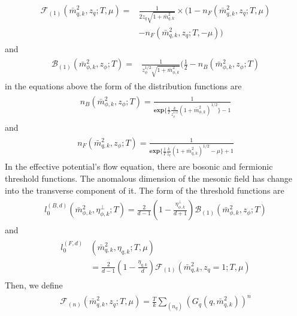 \documentclass[%
reprint,
superscriptaddress,
showpacs,preprintnumbers,
 amsmath,amssymb,
 aps,
prd,
]{revtex4-1}
\begin{document}
\begin{align}
\begin{split}
\mathcal{F}_{(1)}(\bar{m}^{2}_{q,k},z_q;T,\mu)=&\frac{1}{2z_q\sqrt{1+\bar{m}^{2}_{q,k}}}\times(1-n_F(\bar{m}^{2}_{q,k},z_q
;T,\mu)\\&-n_F(\bar{m}^{2}_{q,k},z_q;T,-\mu))
\end{split}
\end{align} 
and
\begin{align}
\begin{split}
\mathcal{B}_{(1)}(\bar{m}^{2}_{\phi,k},z_\phi;T)=&\frac{1}{z_\phi^{1/2}\sqrt{1+\bar{m}^{2}_{\phi,k}}}
(\frac{1}{2}-n_B(\bar{m}^{2}_{\phi,k},z_\phi;T)
\end{split}
\end{align} 
in the equations above the form of the distribution functions are
\begin{align}
\begin{split}
n_B(\bar{m}^{2}_{\phi,k},z_\phi;T)=\frac{1}{\mathbf{exp}\lbrace \frac{1}{T}\frac{k}{z_\phi^{1/2}}(1+\bar{m}^{2}_{\phi,k})^{1/2} 
\rbrace-1}
\end{split}
\end{align} 
and
\begin{align}
\begin{split}
n_F(\bar{m}^{2}_{q,k},z_\phi;T)=\frac{1}{\mathbf{exp}\lbrace \frac{1}{T}\frac{k}{z_q}(1+\bar{m}^{2}_{q,k})^{1/2}-\mu 
\rbrace+1}
\end{split}
\end{align} 
In the effective potential's flow equation, there are bosonic and fermionic threshold functions. The anomalous dimension 
of the mesonic field has change into the transverse component of it. The form of the threshold functions are
\begin{align}
\begin{split}
l_0^{(B,d)}(\bar{m}^{2}_{\phi,k},\eta^\bot_{\phi,k};T)=\frac{2}{d-1}\left( 1- \frac{\eta^{\bot}_{\phi,k}}{d+1}\right) 
\mathcal{B}_{(1)}(\bar{m}^{2}_{\phi,k},z_\phi;T)
\end{split}
\end{align} 
and
\begin{align}
\begin{split}
l_0^{(F,d)}&(\bar{m}^{2}_{q,k},\eta_{q,k};T,\mu)\\&=\frac{2}{d-1}\left( 1-\frac{\eta_{q,k}}{d} \right)\mathcal{F}_{(1)}
(\bar{m}^{2}_{q,k},z_q=1;T,\mu)
\end{split}
\end{align} 
Then, we define
\begin{align}
\begin{split}
\mathcal{F}_{(n)}(\bar{m}^{2}_{q,k},z_q;T,\mu)=\frac{T}{k}\sum_{(n_q)}(G_q(q,\bar{m}^{2}_{q,k}))^n
\end{split}
\end{align} 
\end{document}
